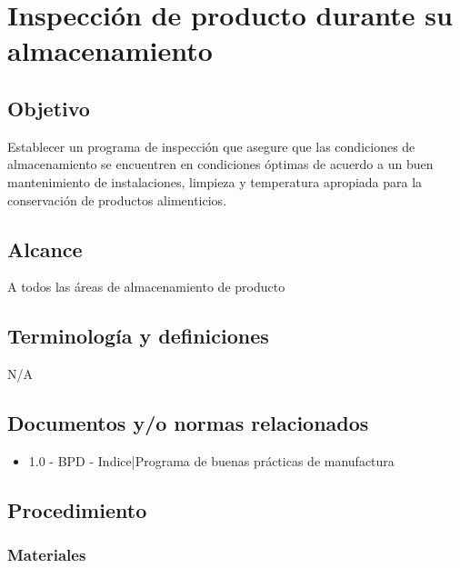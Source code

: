 \renewcommand{\MayorVer}{2}
\renewcommand{\MenorVer}{1}
\renewcommand{\Codigo}{PSA-1-PROG}
\renewcommand{\FechaPub}{2023--01}
\renewcommand{\Titulo}{Inspección de producto durante su almacenamiento}

\section{\Titulo}

\subsection{Objetivo}

Establecer un programa de inspección que asegure que las condiciones de almacenamiento se encuentren en condiciones óptimas de acuerdo a un buen mantenimiento de instalaciones, limpieza y temperatura apropiada para la conservación de productos alimenticios.

\subsection{Alcance}

A todos las áreas de almacenamiento de producto

\subsection{Terminología y definiciones}

N/A

\subsection{Documentos y/o normas relacionados}

\begin{itemize}
	\item 1.0 - BPD - Indice|Programa de buenas prácticas de manufactura
\end{itemize}

\subsection{Procedimiento}

\subsubsection{Materiales}


